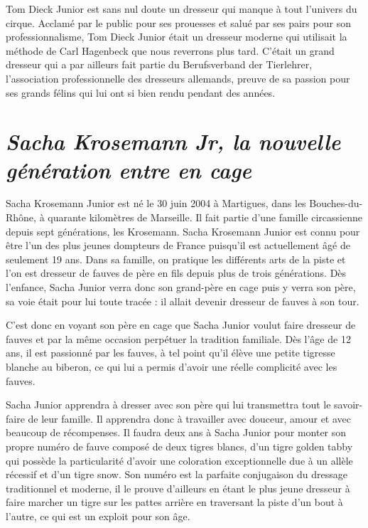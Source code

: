 Tom Dieck Junior est sans nul doute un dresseur qui manque à tout l'univers du cirque. Acclamé par le public pour ses prouesses et salué par ses pairs pour son professionnalisme, Tom Dieck Junior était un dresseur moderne qui utilisait la méthode de Carl Hagenbeck que nous reverrons plus tard. C'était un grand dresseur qui a par ailleurs fait partie du Berufsverband der Tierlehrer, l'association professionnelle des dresseurs allemands, preuve de sa passion pour ses grands félins qui lui ont si bien rendu pendant des années.

\section*{\textit{Sacha Krosemann Jr, la nouvelle génération entre en cage}}

Sacha Krosemann Junior est né le 30 juin 2004 à Martigues, dans les Bouches-du-Rhône, à quarante kilomètres de Marseille. Il fait partie d'une famille circassienne depuis sept générations, les Krosemann. Sacha Krosemann Junior est connu pour être l'un des plus jeunes dompteurs de France puisqu'il est actuellement âgé de seulement 19 ans. Dans sa famille, on pratique les différents arts de la piste et l'on est dresseur de fauves de père en fils depuis plus de trois générations. Dès l'enfance, Sacha Junior verra donc son grand-père en cage puis y verra son père, sa voie était pour lui toute tracée : il allait devenir dresseur de fauves à son tour.

C'est donc en voyant son père en cage que Sacha Junior voulut faire dresseur de fauves et par la même occasion perpétuer la tradition familiale. Dès l'âge de 12 ans, il est passionné par les fauves, à tel point qu'il élève une petite tigresse blanche au biberon, ce qui lui a permis d'avoir une réelle complicité avec les fauves.

Sacha Junior apprendra à dresser avec son père qui lui transmettra tout le savoir-faire de leur famille. Il apprendra donc à travailler avec douceur, amour et avec beaucoup de récompenses. Il faudra deux ans à Sacha Junior pour monter son propre numéro de fauve composé de deux tigres blancs, d'un tigre golden tabby qui possède la particularité d'avoir une coloration exceptionnelle due à un allèle récessif et d'un tigre snow. Son numéro est la parfaite conjugaison du dressage traditionnel et moderne, il le prouve d'ailleurs en étant le plus jeune dresseur à faire marcher un tigre sur les pattes arrière en traversant la piste d'un bout à l'autre, ce qui est un exploit pour son âge.

